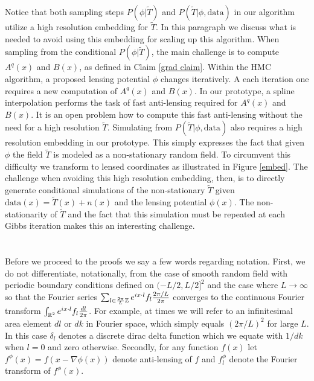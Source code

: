 \documentclass[noinfoline]{imsart}
\begin{document}
Notice that both sampling steps $P(\phi |\widetilde T)$ and $P(\widetilde T|\phi, \text{data})$ in our algorithm utilize a high resolution embedding for $\widetilde T$. In this paragraph we discuss what is needed to avoid using this embedding for scaling up this algorithm. When sampling from the conditional $P(\phi |\widetilde T)$, the main challenge is to compute $A^q(x)$ and $B(x)$, as defined in Claim  \ref{grad claim}.  Within the HMC algorithm, a proposed lensing potential $\phi$ changes iteratively. A each iteration  one requires a new computation of $A^q(x)$ and $B(x)$. In our prototype, a spline interpolation performs the task of fast anti-lensing required for  $A^q(x)$ and $B(x)$. It is an open problem how to compute this fast anti-lensing without the need for a high resolution $\widetilde T$. Simulating from $P(\widetilde T|\phi, \text{data})$ also requires a high resolution embedding in our prototype. This simply expresses the fact that given $\phi$ the field $\widetilde T$ is modeled as a non-stationary random field. To circumvent this difficulty we  transform to lensed coordinates as illustrated in Figure \ref{embed}. The challenge when avoiding this high resolution embedding, then, is to directly generate conditional simulations of the non-stationary $\widetilde T$ given $\text{data}(x)=\widetilde T(x)+ n(x)$ and the lensing potential $\phi(x)$. The non-stationarity of $\widetilde T$ and the fact that this simulation must be repeated at each Gibbs iteration makes this an interesting challenge.







%
%
\appendix

\section{}

Before we proceed to the proofs we say a few words regarding notation.
First, we do not differentiate, notationally, from the case of smooth random field with periodic boundary conditions defined on $(-L/2, L/2]^2$ and the case where $L\rightarrow \infty$ so that the Fourier series $\sum_{l \in \frac{2\pi}{L}\Bbb Z }   e^{i x\cdot l}  f_l \frac{2\pi/ L}{2\pi} $ converges to the continuous Fourier transform $\int_{\Bbb R^2}  e^{i x\cdot l}  f_l \frac{dl}{2\pi} $. %
For example, at times we will refer to an infinitesimal area element $dl$ or $dk$ in Fourier space, which simply equals $(2\pi / L)^2$ for large $L$. In this case $\delta_l$ denotes a discrete dirac delta function which we equate with $1/dk$ when $l=0$ and zero otherwise. 
Secondly, for any function $f(x)$ let $f^\phi(x) = f(x-\nabla \phi(x))$ denote anti-lensing of $f$ and $f^\phi_l$ denote the Fourier transform of  $f^\phi(x)$.
\end{document}
